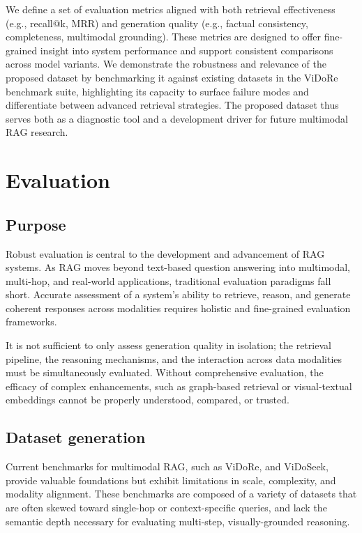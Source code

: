 \documentclass[12pt,twoside]{report}
\begin{document}

We define a set of evaluation metrics aligned with both retrieval effectiveness (e.g., recall@k, MRR) and generation quality (e.g., factual consistency, completeness, multimodal grounding). These metrics are designed to offer fine-grained insight into system performance and support consistent comparisons across model variants. We demonstrate the robustness and relevance of the proposed dataset by benchmarking it against existing datasets in the ViDoRe benchmark suite, highlighting its capacity to surface failure modes and differentiate between advanced retrieval strategies. The proposed dataset thus serves both as a diagnostic tool and a development driver for future multimodal RAG research.

\chapter{Evaluation}
\section{Purpose}
Robust evaluation is central to the development and advancement of RAG systems. As RAG moves beyond text-based question answering into multimodal, multi-hop, and real-world applications, traditional evaluation paradigms fall short. Accurate assessment of a system's ability to retrieve, reason, and generate coherent responses across modalities requires holistic and fine-grained evaluation frameworks.

It is not sufficient to only assess generation quality in isolation; the retrieval pipeline, the reasoning mechanisms, and the interaction across data modalities must be simultaneously evaluated. Without comprehensive evaluation, the efficacy of complex enhancements, such as graph-based retrieval or visual-textual embeddings cannot be properly understood, compared, or trusted.

\section{Dataset generation}
Current benchmarks for multimodal RAG, such as ViDoRe\cite{ColPali}, and ViDoSeek\cite{ViDoRAG}, provide valuable foundations but exhibit limitations in scale, complexity, and modality alignment. These benchmarks are composed of a variety of datasets that are often skewed toward single-hop or context-specific queries, and lack the semantic depth necessary for evaluating multi-step, visually-grounded reasoning.
\end{document}
